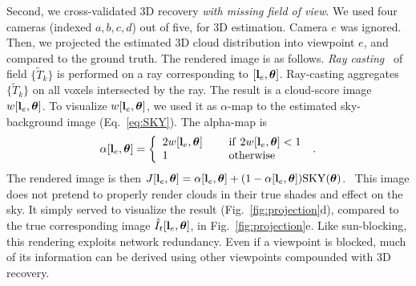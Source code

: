 \documentclass[runningheads]{llncs}
\begin{document}
Second, we cross-validated 3D recovery {\em with missing field of view}. We used four cameras (indexed $a,b,c,d$) out of five, for 3D estimation. Camera $e$ was ignored. Then, we projected the estimated 3D cloud distribution into viewpoint $e$, and compared to the ground truth. The rendered image is as follows. {\em Ray casting}~\cite{Levoy1990} of  field $\{\tilde T_k\}$ is performed on a ray corresponding to
$[{\bf l}_e,{\bm \theta}]$. Ray-casting aggregates $\{\tilde T_k\}$ on all voxels intersected by the ray. The result is a cloud-score image $w[{\bf l}_e,{\bm \theta}]$.
To visualize $w[{\bf l}_e,{\bm \theta}]$, we used it as $\alpha$-map to the estimated sky-background image (Eq.~\ref{eq:SKY}). The alpha-map is
\begin{equation}
 \alpha[{\bf l}_e,{\bm \theta}]=\left\{
      \begin{array}{ll}
      2w[{\bf l}_e,{\bm \theta}]
      & ~~~~{\rm if}~ 2w[{\bf l}_e,{\bm \theta}]<1 \\
      1
      & ~~~~{\rm otherwise}
      \end{array}
      \right.
  \;.
 \label{eq:alpha}
\end{equation}
The rendered image is then
 $J[{\bf l}_e,{\bm \theta}]=
 \alpha[{\bf l}_e,{\bm \theta}]+(1-\alpha[{\bf l}_e,{\bm \theta}]){\rm SKY}({\bm \theta})$.~
This image does not pretend to properly render clouds in their true shades and effect on the sky. It simply served to visualize the result (Fig.~\ref{fig:projection}d), compared to the true corresponding image $\hat I_t[{\bf l}_e,{\bm \theta}]$, in Fig.~\ref{fig:projection}e.
Like sun-blocking, this rendering exploits network redundancy. Even if a viewpoint is blocked, much of its information can be derived using other viewpoints compounded with 3D recovery.
\end{document}
